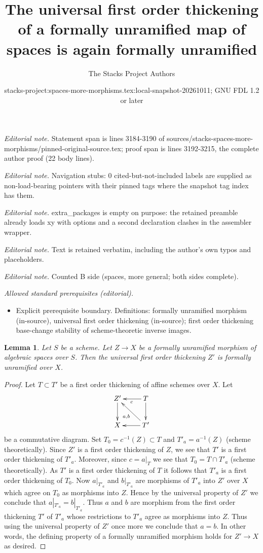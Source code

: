\documentclass[10pt,a4paper]{amsart}
\title{The universal first order thickening of a formally unramified map of spaces is again formally unramified}
\author{The Stacks Project Authors}
\date{stacks-project:spaces-more-morphisms.tex:local-snapshot-20261011; GNU FDL 1.2 or later}
\theoremstyle{plain}
\newtheorem{lemma}[subsection]{Lemma}
\theoremstyle{definition}
\theoremstyle{remark}
\numberwithin{equation}{subsection}
\begin{document}
\maketitle
\noindent\textit{Editorial note.} Statement span is lines 3184-3190 of sources/stacks-spaces-more-morphisms/pinned-original-source.tex; proof span is lines 3192-3215, the complete author proof (22 body lines).\par\medskip
\noindent\textit{Editorial note.} Navigation stubs: 0 cited-but-not-included labels are supplied as non-load-bearing pointers with their pinned tags where the snapshot tag index has them.\par\medskip
\noindent\textit{Editorial note.} extra\_packages is empty on purpose: the retained preamble already loads xy with options and a second declaration clashes in the assembler wrapper.\par\medskip
\noindent\textit{Editorial note.} Text is retained verbatim, including the author's own typos and placeholders.\par\medskip
\noindent\textit{Editorial note.} Counted B side (spaces, more general; both sides complete).\par\medskip
\noindent\textit{Allowed standard prerequisites (editorial).}\begin{itemize}
\item Explicit prerequisite boundary. Definitions: formally unramified morphism (in-source), universal first order thickening (in-source); first order thickening base-change stability of scheme-theoretic inverse images.
\end{itemize}\medskip
\begin{lemma}
\label{lemma-universal-thickening-unramified}
Let $S$ be a scheme.
Let $Z \to X$ be a formally unramified morphism of algebraic spaces over $S$.
Then the universal first order thickening $Z'$ is formally
unramified over $X$.
\end{lemma}

\begin{proof}
Let $T \subset T'$ be a first order thickening of affine schemes over $X$.
Let
$$
\xymatrix{
Z' \ar[d] & T \ar[l]^c \ar[d] \\
X & T' \ar[l] \ar[lu]^{a, b}
}
$$
be a commutative diagram. Set $T_0 = c^{-1}(Z) \subset T$ and
$T'_a = a^{-1}(Z)$ (scheme theoretically).
Since $Z'$ is a first order thickening of $Z$, we see that $T'$
is a first order thickening of $T'_a$. Moreover, since $c = a|_T$ we see that
$T_0 = T \cap T'_a$ (scheme theoretically). As $T'$ is a first order
thickening of $T$ it follows that $T'_a$
is a first order thickening of $T_0$. Now $a|_{T'_a}$ and $b|_{T'_a}$
are morphisms of $T'_a$ into $Z'$ over $X$ which agree on $T_0$ as
morphisms into $Z$. Hence by the universal property of $Z'$ we conclude that
$a|_{T'_a} = b|_{T'_a}$. Thus $a$ and $b$ are morphism from
the first order thickening $T'$ of $T'_a$ whose restrictions to
$T'_a$ agree as morphisms into $Z$. Thus using the universal property of
$Z'$ once more we conclude that $a = b$. In other words, the defining
property of a formally unramified morphism holds for $Z' \to X$ as desired.
\end{proof}
\end{document}
